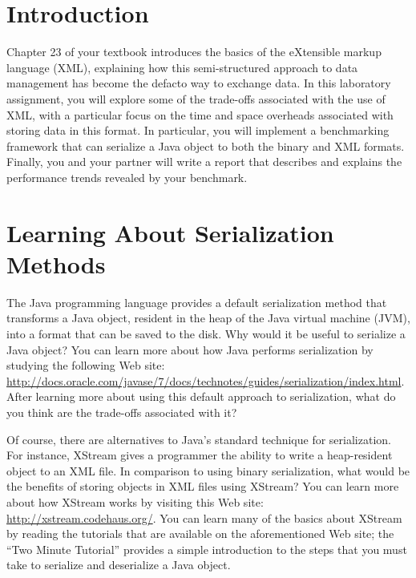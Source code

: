 


\usepackage[compact]{titlesec}



\section*{Introduction}

Chapter 23 of your textbook introduces the basics of the eXtensible markup language (XML), explaining how this
semi-structured approach to data management has become the defacto way to exchange data. In this laboratory assignment,
you will explore some of the trade-offs associated with the use of XML, with a particular focus on the time and space
overheads associated with storing data in this format. In particular, you will implement a benchmarking framework that
can serialize a Java object to both the binary and XML formats.  Finally, you and your partner will write a 
report that describes and explains the performance trends revealed by your benchmark.

\vspace*{-.05in}
\section*{Learning About Serialization Methods}

The Java programming language provides a default serialization method that transforms a Java object, resident in the
heap of the Java virtual machine (JVM), into a format that can be saved to the disk. Why would it be useful to serialize
a Java object? You can learn more about how Java performs serialization by studying the following Web site:
\url{http://docs.oracle.com/javase/7/docs/technotes/guides/serialization/index.html}. After learning more about using
this default approach to serialization, what do you think are the trade-offs associated with it?

Of course, there are alternatives to Java's standard technique for serialization.  For instance, XStream gives a
programmer the ability to write a heap-resident object to an XML file. In comparison to using binary serialization, what
would be the benefits of storing objects in XML files using XStream? You can learn more about how XStream works by
visiting this Web site: \url{http://xstream.codehaus.org/}. You can learn many of the basics about XStream by reading
the tutorials that are available on the aforementioned Web site; the ``Two Minute Tutorial'' provides a simple
introduction to the steps that you must take to serialize and deserialize a Java object. 

